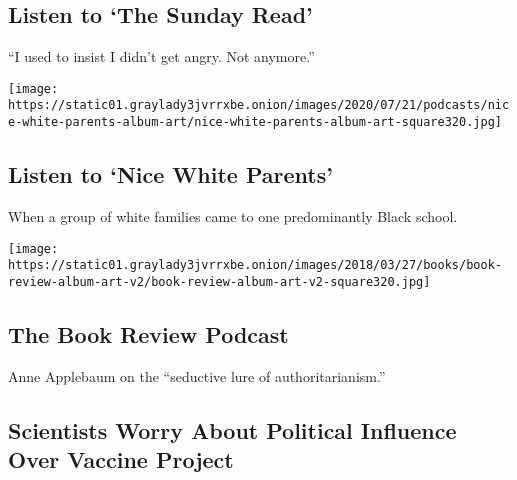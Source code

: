\href{/2020/08/02/podcasts/the-daily/on-female-rage.html}{}

\hypertarget{listen-to-the-sunday-read}{%
\subsection{Listen to `The Sunday
Read'}\label{listen-to-the-sunday-read}}

``I used to insist I didn't get angry. Not anymore.''

\href{/2020/07/30/podcasts/nice-white-parents-serial.html}{}

\texttt{[image: https://static01.graylady3jvrrxbe.onion/images/2020/07/21/podcasts/nice-white-parents-album-art/nice-white-parents-album-art-square320.jpg]}

\href{/2020/07/30/podcasts/nice-white-parents-serial.html}{}

\hypertarget{listen-to-nice-white-parents}{%
\subsection{Listen to `Nice White
Parents'}\label{listen-to-nice-white-parents}}

When a group of white families came to one predominantly Black school.

\href{/2020/07/31/books/review/podcast-twilight-democracy-anne-applebaum-eat-buddha-barbara-demick.html}{}

\texttt{[image: https://static01.graylady3jvrrxbe.onion/images/2018/03/27/books/book-review-album-art-v2/book-review-album-art-v2-square320.jpg]}

\href{/2020/07/31/books/review/podcast-twilight-democracy-anne-applebaum-eat-buddha-barbara-demick.html}{}

\hypertarget{the-book-review-podcast}{%
\subsection{The Book Review Podcast}\label{the-book-review-podcast}}

Anne Applebaum on the ``seductive lure of authoritarianism.''

\href{/2020/08/02/us/politics/coronavirus-vaccine.html}{}

\hypertarget{scientists-worry-about-political-influence-over-vaccine-project}{%
\subsection{Scientists Worry About Political Influence Over Vaccine
Project}\label{scientists-worry-about-political-influence-over-vaccine-project}}

